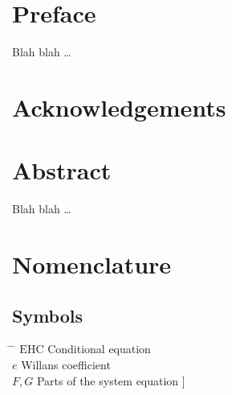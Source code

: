 
\chapter*{Preface}

Blah blah \dots

 \cleardoublepage


 \setcounter{tocdepth}{4}
 \tableofcontents

 \cleardoublepage


\chapter*{Acknowledgements}
\cleardoublepage

\chapter*{Abstract}

Blah blah \dots

 \cleardoublepage


\chapter*{Nomenclature}\label{chap:symbole}

\section*{Symbols}
\begin{tabbing}
 \hspace*{1.6cm} \= \hspace*{8cm} \= \kill
 $\mathrm{EHC}$ \> Conditional equation \> [$-$] \\[0.5ex]
 $e$ \> Willans coefficient \> [$-$] \\[0.5ex]
 $F,G$ \> Parts of the system equation \> [\unitfrac[]{K}{s}]
\end{tabbing}


